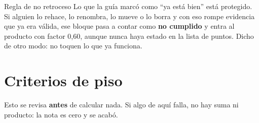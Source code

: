 \documentclass[11pt,a4paper]{article}
\begin{document}
\vspace{6pt}
\begin{cajaverde}{Regla de no retroceso}
Lo que la guía marcó como ``ya está bien'' está protegido. Si alguien lo rehace, lo renombra, lo mueve o lo borra y con eso rompe evidencia que ya era válida, ese bloque pasa a contar como \textbf{no cumplido} y entra al producto con factor 0,60, aunque nunca haya estado en la lista de puntos. Dicho de otro modo: no toquen lo que ya funciona.
\end{cajaverde}

\section*{Criterios de piso}

Esto se revisa \textbf{antes} de calcular nada. Si algo de aquí falla, no hay suma ni producto: la nota es cero y se acabó.
\end{document}
